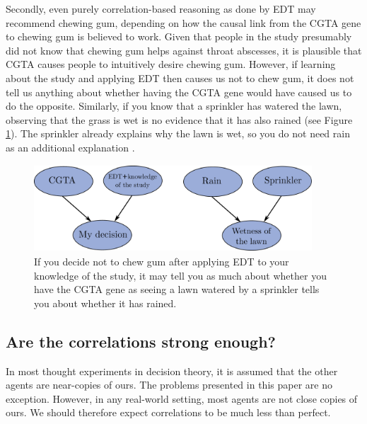 Secondly, even purely correlation-based reasoning as done by EDT may
recommend chewing gum, depending on how the causal link from the CGTA
gene to chewing gum is believed to work. Given that people in the study
presumably did not know that chewing gum helps against throat abscesses,
it is plausible that CGTA causes people to intuitively desire chewing
gum. However, if learning about the study and applying EDT then causes
us not to chew gum, it does not tell us anything about whether having
the CGTA gene would have caused us to do the opposite. Similarly, if you
know that a sprinkler has watered the lawn, observing that the grass is
wet is no evidence that it has also rained (see Figure
\ref{tickle-defense}). The sprinkler already explains why the lawn is wet,
so you do not need rain as an additional explanation
\parencite{Ahmed2014-ec}.


\begin{figure}[h!]
    \centering
    \includegraphics[width=4.09792in,height=1.27975in]{figs/tickle-defense}
    \caption{If you decide not to chew gum after applying EDT
to your knowledge of the study, it may tell you as much about whether
you have the CGTA gene as seeing a lawn watered by a sprinkler tells you
about whether it has rained.}
    \label{tickle-defense}
\end{figure}

\hypertarget{are-the-correlations-strong-enough}{\subsection{Are the
correlations strong enough?}\label{are-the-correlations-strong-enough}}

In most thought experiments in decision theory, it is assumed that the
other agents are near-copies of ours. The problems presented in this
paper are no exception. However, in any real-world setting, most agents
are not close copies of ours. We should therefore expect correlations to
be much less than perfect.

